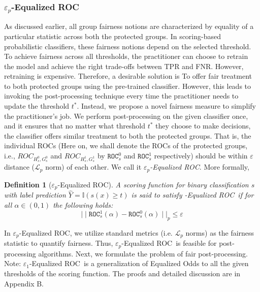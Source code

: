 \documentclass{article}
\newtheorem{definition}{Definition}[section]
\newcommand{\ourdef}{-Equalized ROC}
\newcommand{\roc}{\texttt{ROC}_s}
\begin{document}
\subsubsection*{$\varepsilon_p$\ourdef}
As discussed earlier, all group fairness notions are characterized by equality of a particular statistic across both the protected groups.  
In scoring-based probabilistic classifiers, these fairness notions depend on the selected threshold.
To achieve fairness across all thresholds, the practitioner can choose to retrain the model and achieve the right trade-offs between TPR and FNR.
However, retraining is expensive. Therefore, a desirable solution is 
To offer fair treatment to both protected groups using the pre-trained classifier.
However, this leads to invoking the post-processing technique every time the practitioner needs to update the threshold $t^*$. 
Instead, we propose a novel fairness measure to simplify the practitioner's job.
We perform post-processing on the given classifier once, and it ensures that no matter what threshold $t^*$ they choose to make decisions, the classifier offers similar treatment to both the protected groups. That is, the individual ROCs (Here on, we shall denote the ROCs of the protected groups, i.e., $ROC_{H_s^{0}, G_s^{0}}$ and $ROC_{H_s^{1}, G_s^{1}}$ by $\roc^0$ and $\roc^1$ respectively) should be within $\varepsilon$ distance ($\mathcal{L}_p$ norm) of each other.   We call it \emph{$\varepsilon_p$\ourdef}. More formally, 
\begin{definition}[$\varepsilon_p$\ourdef] \label{def:eroc}
A scoring function for binary classification $s$ with label prediction $\widehat{Y} = \mathbb{I}(s(x) \geq t)$ is said to satisfy \ourdef\ if for all $\alpha \in (0,1)$ the following holds:
\begin{equation}
    {\mid \mid \roc^1(\alpha) - \roc^0(\alpha) \mid \mid}_p \leq \varepsilon
\end{equation}
\end{definition}


\noindent In $\varepsilon_p$\ourdef, we utilize standard metrics (i.e. $\mathcal{L}_p$ norms) as the fairness statistic to quantify fairness. Thus, $\varepsilon_p$\ourdef\ is feasible for post-processing algorithms.
Next, we formulate the problem of fair post-processing. Note: $\varepsilon_1$\ourdef\ is a generalization of Equalized Odds to all the given thresholds of the scoring function. The proofs and detailed discussion are in Appendix B. 
\end{document}
